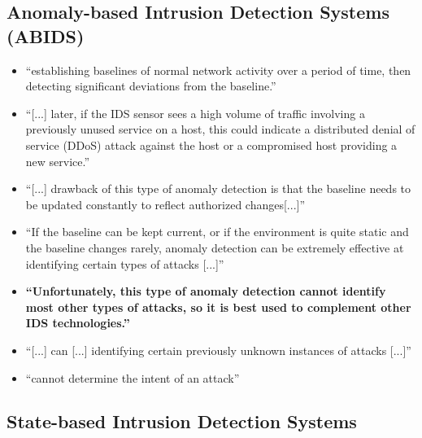 	\subsection{Anomaly-based Intrusion Detection Systems (ABIDS)}
		\begin{itemize}
			\item \enquote{establishing baselines of normal network activity over a period of time, then detecting significant deviations from the baseline.} \parencite[p. 203]{Northcutt2005}
			\item \enquote{[...] later, if the IDS sensor sees a high volume of traffic involving a previously unused service on a host, this could indicate a distributed denial of service (DDoS) attack against the host or a compromised host providing a new service.} \parencite{Northcutt2005}
			\item \enquote{[...] drawback of this type of anomaly detection is that the baseline needs to be updated constantly to reflect authorized changes[...]} \parencite{Northcutt2005}
			\item \enquote{If the baseline can be kept current, or if the environment is quite static and the baseline changes rarely, anomaly detection can be extremely effective at identifying certain types of attacks [...]} \parencite{Northcutt2005}
			\item \textbf{\enquote{Unfortunately, this type of anomaly detection cannot identify most other types of attacks, so it is best used to complement other IDS technologies.}} \parencite{Northcutt2005}
			\item \enquote{[...] can [...] identifying certain previously unknown instances of attacks [...]} \parencite{Northcutt2005}
			\item \enquote{cannot determine the intent of an attack} \parencite{Northcutt2005}
			
		\end{itemize}
	
	\subsection{State-based Intrusion Detection Systems}
	

